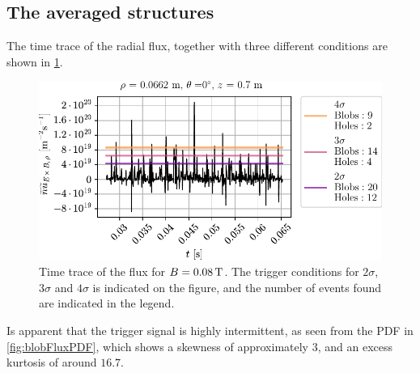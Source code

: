 \subsection{The averaged structures}
The time trace of the radial flux, together with three different conditions are shown in \cref{fig:blobFluxTT}.
%
\begin{figure}[htb]
    \begin{center}
        \includegraphics{fig/results/blobs/blobFluxTimeTrace_B0_008Tweak}
    \end{center}
    \caption{
        Time trace of the flux for $B=0.08\, \text{T}$.
        The trigger conditions for $2\sigma$, $3\sigma$ and $4\sigma$ is indicated on the figure, and the number of events found are indicated in the legend.
    }
    \label{fig:blobFluxTT}
\end{figure}
%
Is apparent that the trigger signal is highly intermittent, as seen from the PDF in \cref{fig:blobFluxPDF}, which shows a skewness of approximately $3$, and an excess kurtosis of around $16.7$.
%
